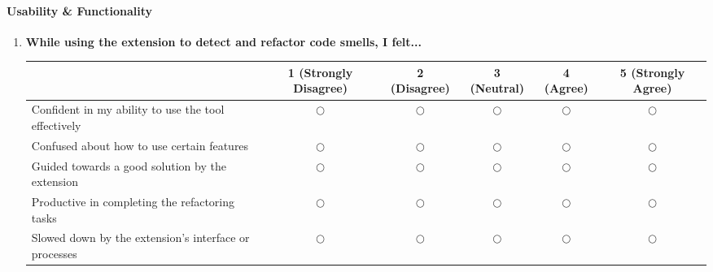 \documentclass{article}
\begin{document}
\paragraph{Usability \& Functionality}
\begin{enumerate}
    \item \textbf{While using the extension to detect and refactor code smells, I felt...}
    
    \begin{tabularx}{\textwidth}{|X|c|c|c|c|c|}
        \hline
        & 1 (Strongly Disagree) & 2 (Disagree) & 3 (Neutral) & 4 (Agree) & 5 (Strongly Agree) \\
        \hline
        Confident in my ability to use the tool effectively & $\bigcirc$ & $\bigcirc$ & $\bigcirc$ & $\bigcirc$ & $\bigcirc$ \\
        \hline
        Confused about how to use certain features & $\bigcirc$ & $\bigcirc$ & $\bigcirc$ & $\bigcirc$ & $\bigcirc$ \\
        \hline
        Guided towards a good solution by the extension & $\bigcirc$ & $\bigcirc$ & $\bigcirc$ & $\bigcirc$ & $\bigcirc$ \\
        \hline
        Productive in completing the refactoring tasks & $\bigcirc$ & $\bigcirc$ & $\bigcirc$ & $\bigcirc$ & $\bigcirc$ \\
        \hline
        Slowed down by the extension's interface or processes & $\bigcirc$ & $\bigcirc$ & $\bigcirc$ & $\bigcirc$ & $\bigcirc$ \\
        \hline
    \end{tabularx}
\end{enumerate}
\end{document}
